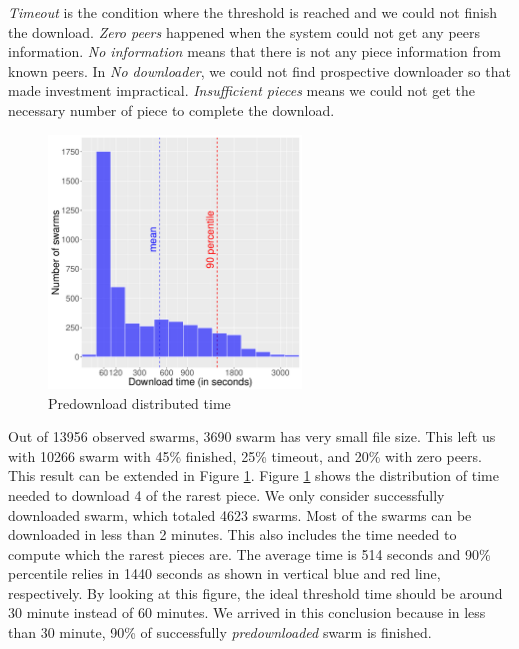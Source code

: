 \textit{Timeout} is the condition where the threshold is reached and we could not finish the download. \textit{Zero peers} happened when the system could not get any peers information. \textit{No information} means that there is not any piece information from known peers. In \textit{No downloader}, we could not find prospective downloader so that made investment impractical. \textit{Insufficient pieces} means we could not get the necessary number of piece to complete the download.

\begin{figure}[b!]
		\centering
		\includegraphics[width=0.6\textwidth]{pics/results/hpredown.pdf}
		\caption{Predownload distributed time}
		\label{fig:predownhist}
\end{figure}

Out of 13956 observed swarms, 3690 swarm has very small file size. This left us with 10266 swarm with 45\% finished, 25\% timeout, and 20\% with zero peers. This result can be extended in Figure \ref{fig:predownhist}. Figure \ref{fig:predownhist} shows the distribution of time needed to download 4 of the rarest piece. We only consider successfully downloaded swarm, which totaled 4623 swarms. Most of the swarms can be downloaded in less than 2 minutes. This also includes the time needed to compute which the rarest pieces are. The average time is 514 seconds and 90\% percentile relies in 1440 seconds as shown in vertical blue and red line, respectively. By looking at this figure, the ideal threshold time should be around 30 minute instead of 60 minutes. We arrived in this conclusion because in less than 30 minute, 90\% of successfully \textit{predownloaded} swarm is finished.

